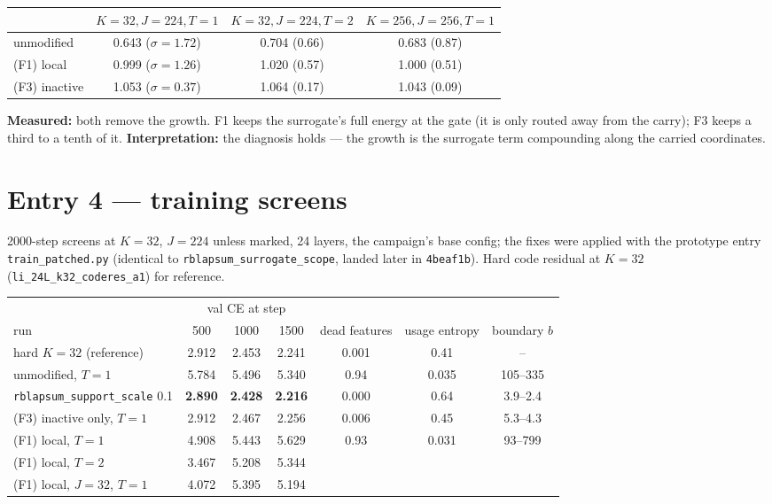 \documentclass[11pt,a4paper]{article}
\newcommand{\code}[1]{\texttt{#1}}
\begin{document}
\begin{center}\small
\begin{tabular}{lccc}
\toprule
 & \(K=32,J=224,T=1\) & \(K=32,J=224,T=2\) & \(K=256,J=256,T=1\) \\
\midrule
unmodified     & 0.643 (\(\sigma=1.72\)) & 0.704 (0.66) & 0.683 (0.87) \\
(F1) local     & 0.999 (\(\sigma=1.26\)) & 1.020 (0.57) & 1.000 (0.51) \\
(F3) inactive  & 1.053 (\(\sigma=0.37\)) & 1.064 (0.17) & 1.043 (0.09) \\
\bottomrule
\end{tabular}
\end{center}

\textbf{Measured:} both remove the growth.  F1 keeps the surrogate's full energy at the gate (it is only routed
away from the carry); F3 keeps a third to a tenth of it.  \textbf{Interpretation:} the diagnosis holds --- the
growth is the surrogate term compounding along the carried coordinates.

\section{Entry 4 --- training screens}

2000-step screens at \(K=32\), \(J=224\) unless marked, 24 layers, the campaign's base config; the fixes were
applied with the prototype entry \code{train\_patched.py} (identical to \code{rblapsum\_surrogate\_scope}, landed
later in \code{4beaf1b}).  Hard code residual at \(K=32\) (\code{li\_24L\_k32\_coderes\_a1}) for reference.

\begin{center}\small
\begin{tabular}{lcccccc}
\toprule
 & \multicolumn{3}{c}{val CE at step} & & & \\
run & 500 & 1000 & 1500 & dead features & usage entropy & boundary \(b\) \\
\midrule
hard \(K=32\) (reference)          & 2.912 & 2.453 & 2.241 & 0.001 & 0.41 & -- \\
unmodified, \(T=1\)                & 5.784 & 5.496 & 5.340 & 0.94 & 0.035 & 105--335 \\
\code{rblapsum\_support\_scale} 0.1 & \textbf{2.890} & \textbf{2.428} & \textbf{2.216} & 0.000 & 0.64 & 3.9--2.4 \\
(F3) inactive only, \(T=1\)         & 2.912 & 2.467 & 2.256 & 0.006 & 0.45 & 5.3--4.3 \\
(F1) local, \(T=1\)                 & 4.908 & 5.443 & 5.629 & 0.93 & 0.031 & 93--799 \\
(F1) local, \(T=2\)                 & 3.467 & 5.208 & 5.344 & & & \\
(F1) local, \(J=32\), \(T=1\)        & 4.072 & 5.395 & 5.194 & & & \\
\bottomrule
\end{tabular}
\end{center}
\end{document}
